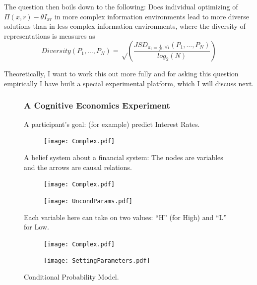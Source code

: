 \documentclass{beamer}
\begin{document}
\begin{frame}
The question then boils down to the following: Does individual optimizing of $\Pi(x, r) - \theta I_{xr}$ in more complex information environments lead to more diverse solutions than in less complex information environments, where the diversity of representations is measures as
\begin{equation}
Diversity(P_1, \ldots, P_N)=\sqrt\left(\frac{JSD_{\pi_i=\frac{1}{N}; \forall i}(P_1, \ldots, P_N)}{log_2(N)}\right)
\end{equation}

Theoretically, I want to work this out more fully and for asking this question empirically I have built a special experimental platform, which I will discuss next.   
\end{frame}
\begin{frame}
\small
\begin{figure}
\frametitle{A Cognitive Economics Experiment}
A participant's goal: (for example) predict Interest Rates. 
        \centering
        \begin{subfigure}[b]{0.5\textwidth}
                \texttt{[image: Complex.pdf]}
                
        \end{subfigure}%
       \caption{A belief system about a financial system: The nodes are variables and the arrows are causal relations.}
\end{figure}
\end{frame}

\begin{frame}
\begin{figure}
        \centering
        \begin{subfigure}[b]{0.3\textwidth}
                \texttt{[image: Complex.pdf]}
                
        \end{subfigure}%
       \begin{subfigure}[b]{0.7\textwidth}
        \texttt{[image: UncondParams.pdf]}
       \end{subfigure}%
\caption{Each variable here can take on two values: ``H'' (for High) and ``L'' for Low.}
\end{figure}
\end{frame}

\begin{frame}
\begin{figure}
        \centering
        \begin{subfigure}[b]{0.3\textwidth}
                \texttt{[image: Complex.pdf]}
                
        \end{subfigure}%
       \begin{subfigure}[b]{0.7\textwidth}
        \texttt{[image: SettingParameters.pdf]}
       \end{subfigure}%
                \caption{Conditional Probability Model.}
\end{figure}
\end{frame}
\end{document}
